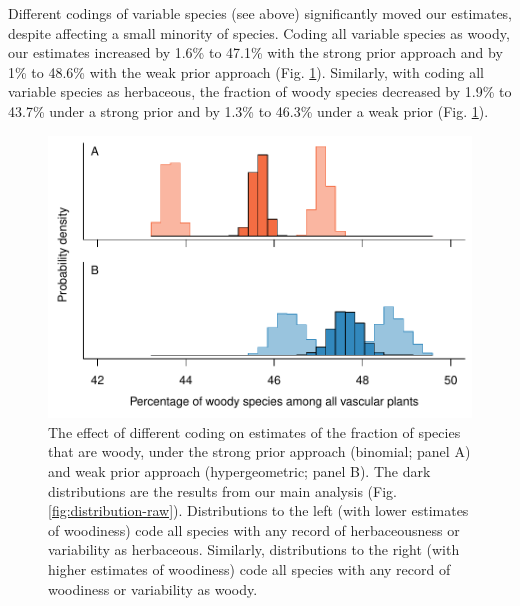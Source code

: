 Different codings of variable species (see above) significantly moved
our estimates, despite affecting a small minority of species.  Coding
all variable species as woody, our estimates
increased by 1.6\% to 47.1\% with the strong prior approach
and by 1\% to 48.6\% with the weak prior approach (Fig.
\ref{fig:distribution-raw-errors}). Similarly, with coding
all variable species as herbaceous, the fraction of woody species
decreased by 1.9\% to 43.7\% under a strong prior
and by 1.3\% to 46.3\% under a weak prior (Fig.
\ref{fig:distribution-raw-errors}).

\begin{figure}[p]
  \centering
  \includegraphics[width=\textwidth]{figs/distribution-raw-errors}
  \caption[The effect of different coding on estimates]{The effect of
    different coding on estimates of the fraction of species that are
    woody, under the strong prior approach (binomial; panel A) and
    weak prior approach (hypergeometric; panel B).  The dark
    distributions are the results from our main analysis
    (Fig. \ref{fig:distribution-raw}).  Distributions to the left
    (with lower estimates of woodiness) code all species with any
    record of herbaceousness or variability as herbaceous.  Similarly,
    distributions to the right (with higher estimates of woodiness)
    code all species with any record of woodiness or variability as
    woody.}
  \label{fig:distribution-raw-errors}
\end{figure}

